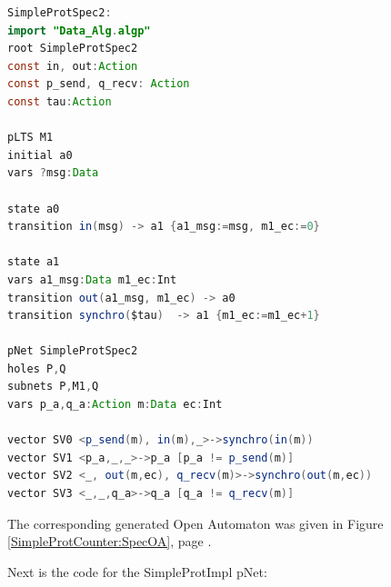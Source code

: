
\begin{lstlisting}[basicstyle=\scriptsize\ttfamily, language=java, frame=single]
SimpleProtSpec2:
import "Data_Alg.algp"
root SimpleProtSpec2
const in, out:Action
const p_send, q_recv: Action
const tau:Action

pLTS M1
initial a0 
vars ?msg:Data

state a0
transition in(msg) -> a1 {a1_msg:=msg, m1_ec:=0}

state a1
vars a1_msg:Data m1_ec:Int
transition out(a1_msg, m1_ec) -> a0
transition synchro($tau)  -> a1 {m1_ec:=m1_ec+1}

pNet SimpleProtSpec2
holes P,Q
subnets P,M1,Q
vars p_a,q_a:Action m:Data ec:Int

vector SV0 <p_send(m), in(m),_>->synchro(in(m))
vector SV1 <p_a,_,_>->p_a [p_a != p_send(m)]
vector SV2 <_, out(m,ec), q_recv(m)>->synchro(out(m,ec))
vector SV3 <_,_,q_a>->q_a [q_a != q_recv(m)]

  \end{lstlisting}

The corresponding generated Open Automaton was given in Figure \ref{SimpleProtCounter:SpecOA},
page \pageref{SimpleProtCounter:SpecOA}.

Next is the code for the SimpleProtImpl pNet:

